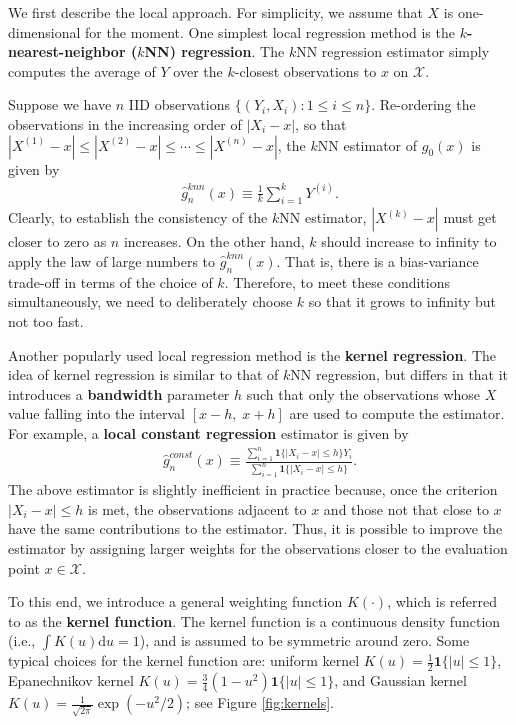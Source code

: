 \documentclass[10.5pt, A4paper, openany, uplatex]{book}
\newcommand{\mbf}{\mathbf}
\newcommand{\mcl}{\mathcal}
\renewcommand{\hat}{\widehat}
\numberwithin{equation}{section}
\begin{document}
We first describe the local approach.
For simplicity, we assume that $X$ is one-dimensional for the moment.
One simplest local regression method is the \textbf{$k$-nearest-neighbor ($k$NN) regression}.
The $k$NN regression estimator simply computes the average of $Y$ over the $k$-closest observations to $x$ on $\mcl{X}$.

Suppose we have $n$ IID observations $\{(Y_i, X_i): 1 \le i \le n\}$.
Re-ordering the observations in the increasing order of $|X_i - x|$, so that $|X^{(1)} - x| \le |X^{(2)} - x| \le \cdots \le |X^{(n)} - x|$, the $k$NN estimator of $g_0(x)$ is given by
\begin{align*}
	\hat g^{knn}_n(x) \equiv \frac{1}{k}\sum_{i = 1}^k Y^{(i)}.
\end{align*}
Clearly, to establish the consistency of the $k$NN estimator, $|X^{(k)} - x|$ must get closer to zero as $n$ increases.
On the other hand, $k$ should increase to infinity to apply the law of large numbers to $\hat g^{knn}_n(x)$. 
That is, there is a bias-variance trade-off in terms of the choice of $k$.
Therefore, to meet these conditions simultaneously, we need to deliberately choose $k$ so that it grows to infinity but not too fast.

\bigskip

Another popularly used local regression method is the \textbf{kernel regression}.
The idea of kernel regression is similar to that of $k$NN regression, but differs in that it introduces a \textbf{bandwidth} parameter $h$ such that only the observations whose $X$ value falling into the interval $[x-h, \; x+h]$ are used to compute the estimator.
For example, a \textbf{local constant regression} estimator is given by
\begin{align*}
	\hat g^{const}_n(x) \equiv \frac{\sum_{i = 1}^n \mbf{1}\{|X_i - x | \le h\} Y_i}{\sum_{i = 1}^n\mbf{1}\{|X_i - x | \le h\}}.
\end{align*}
The above estimator is slightly inefficient in practice because, once the criterion $|X_i - x | \le h$ is met, the observations adjacent to $x$ and those not that close to $x$ have the same contributions to the estimator.
Thus, it is possible to improve the estimator by assigning larger weights for the observations closer to the evaluation point $x \in \mcl{X}$.

To this end, we introduce a general weighting function $K(\cdot)$, which is referred to as the \textbf{kernel function}.
The kernel function is a continuous density function (i.e., $\int K(u)\text{d}u = 1$), and is assumed to be symmetric around zero.
Some typical choices for the kernel function are: uniform kernel $K(u) = \frac{1}{2}\mbf{1}\{|u| \le 1\}$, Epanechnikov kernel $K(u) = \frac{3}{4}(1-u^2)\mbf{1}\{|u| \le 1\}$, and Gaussian kernel $K(u) = \frac{1}{\sqrt{2\pi}}\exp(-u^2/2)$; see Figure \ref{fig:kernels}.
\end{document}
